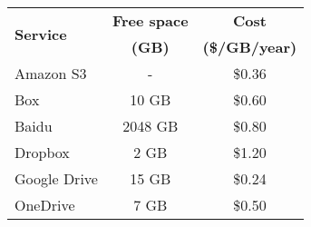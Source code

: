 \begin{tabular}{lcc}
\toprule
  \multirow{2}{*}{\bf Service}
    & {\bf Free space}
  & \textbf{Cost} \\
    & {\bf (GB)}
    & {\bf (\$/GB/year)}\\
\midrule
  Amazon S3
    & -
    & \$0.36 \\
  Box
    & \phantom{00}10 GB
    & \$0.60 \\
  Baidu
    & 2048 GB
    & \$0.80 \\
  Dropbox
    & \phantom{000}2 GB
    & \$1.20 \\
  Google Drive
    & \phantom{00}15 GB
    & \$0.24 \\
  OneDrive
    & \phantom{000}7 GB
    & \$0.50 \\
\bottomrule
\end{tabular}